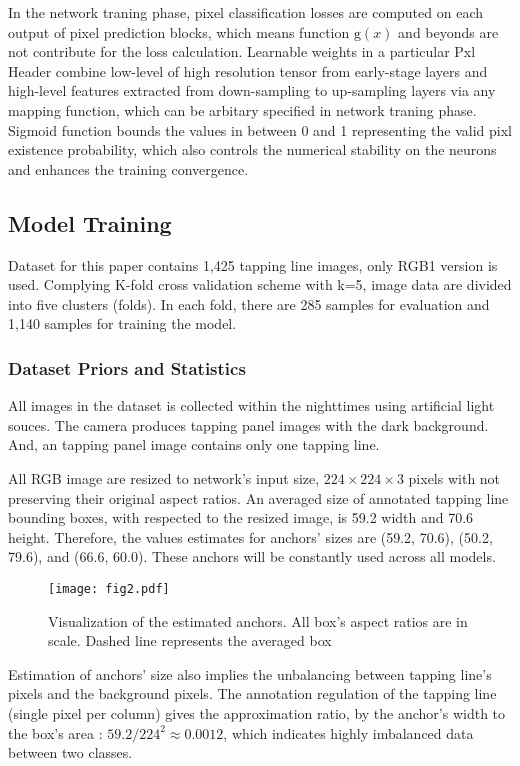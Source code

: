 \documentclass[default,pdflatex,iicol]{sn-jnl}%
\begin{document}
In the network traning phase, pixel classification losses are computed on each output of pixel prediction blocks, which means function $\mathrm{g}(x)$ and beyonds are not contribute for the loss calculation. Learnable weights in a particular Pxl Header combine low-level of high resolution tensor from early-stage layers and high-level features extracted from down-sampling to up-sampling layers via any mapping function, which can be arbitary specified in network traning phase. Sigmoid function bounds the values in between 0 and 1 representing the valid pixl existence probability, which also controls the numerical stability on the neurons and enhances the training convergence.

\subsection{Model Training}
Dataset for this paper contains 1,425 tapping line images, only RGB1 version \cite{Wongtanawijit_2021} is used. Complying K-fold cross validation scheme with k=5, image data are divided into five clusters (folds). In each fold, there are 285 samples for evaluation and 1,140 samples for training the model.

\subsubsection{Dataset Priors and Statistics}
All images in the dataset is collected within the nighttimes using artificial light souces. The camera produces tapping panel images with the dark background. And, an tapping panel image contains only one tapping line.

All RGB image are resized to network's input size, $224\times224\times3$ pixels with not preserving their original aspect ratios. An averaged size of annotated tapping line bounding boxes, with respected to the resized image, is 59.2 width and 70.6 height. Therefore, the values estimates for anchors' sizes are (59.2, 70.6), (50.2, 79.6), and (66.6, 60.0). These anchors will be constantly used across all models.

\begin{figure}[h]%
\centering
\texttt{[image: fig2.pdf]}
\caption{Visualization of the estimated anchors. All box's aspect ratios are in scale. Dashed line represents the averaged box}\label{fig2-anchors}
\end{figure}

Estimation of anchors' size also implies the unbalancing between tapping line's pixels and the background pixels. The annotation regulation of the tapping line (single pixel per column) gives the approximation ratio, by the anchor's width to the box's area : $59.2 / 224^2 \approx 0.0012$, which indicates highly imbalanced data between two classes.
\end{document}
